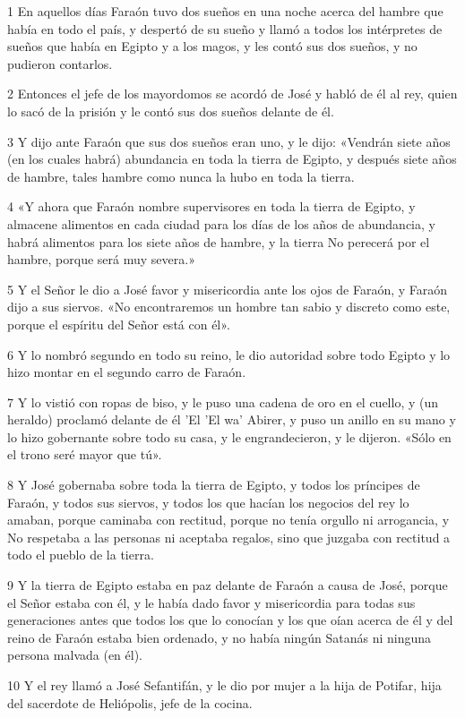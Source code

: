 \par 1 En aquellos días Faraón tuvo dos sueños en una noche acerca del hambre que había en todo el país, y despertó de su sueño y llamó a todos los intérpretes de sueños que había en Egipto y a los magos, y les contó sus dos sueños, y no pudieron contarlos.
\par 2 Entonces el jefe de los mayordomos se acordó de José y habló de él al rey, quien lo sacó de la prisión y le contó sus dos sueños delante de él.
\par 3 Y dijo ante Faraón que sus dos sueños eran uno, y le dijo: «Vendrán siete años (en los cuales habrá) abundancia en toda la tierra de Egipto, y después siete años de hambre, tales hambre como nunca la hubo en toda la tierra.
\par 4 «Y ahora que Faraón nombre supervisores en toda la tierra de Egipto, y almacene alimentos en cada ciudad para los días de los años de abundancia, y habrá alimentos para los siete años de hambre, y la tierra No perecerá por el hambre, porque será muy severa.»
\par 5 Y el Señor le dio a José favor y misericordia ante los ojos de Faraón, y Faraón dijo a sus siervos. «No encontraremos un hombre tan sabio y discreto como este, porque el espíritu del Señor está con él».
\par 6 Y lo nombró segundo en todo su reino, le dio autoridad sobre todo Egipto y lo hizo montar en el segundo carro de Faraón.
\par 7 Y lo vistió con ropas de biso, y le puso una cadena de oro en el cuello, y (un heraldo) proclamó delante de él 'El 'El wa' Abirer, y puso un anillo en su mano y lo hizo gobernante sobre todo su casa, y le engrandecieron, y le dijeron. «Sólo en el trono seré mayor que tú».
\par 8 Y José gobernaba sobre toda la tierra de Egipto, y todos los príncipes de Faraón, y todos sus siervos, y todos los que hacían los negocios del rey lo amaban, porque caminaba con rectitud, porque no tenía orgullo ni arrogancia, y No respetaba a las personas ni aceptaba regalos, sino que juzgaba con rectitud a todo el pueblo de la tierra.
\par 9 Y la tierra de Egipto estaba en paz delante de Faraón a causa de José, porque el Señor estaba con él, y le había dado favor y misericordia para todas sus generaciones antes que todos los que lo conocían y los que oían acerca de él y del reino de Faraón estaba bien ordenado, y no había ningún Satanás ni ninguna persona malvada (en él).
\par 10 Y el rey llamó a José Sefantifán, y le dio por mujer a la hija de Potifar, hija del sacerdote de Heliópolis, jefe de la cocina.
